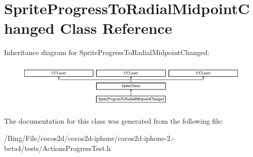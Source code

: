 \hypertarget{interface_sprite_progress_to_radial_midpoint_changed}{\section{Sprite\-Progress\-To\-Radial\-Midpoint\-Changed Class Reference}
\label{interface_sprite_progress_to_radial_midpoint_changed}
}
Inheritance diagram for Sprite\-Progress\-To\-Radial\-Midpoint\-Changed\-:\begin{figure}[H]
\begin{center}
\leavevmode
\includegraphics[height=2.222222cm]{interface_sprite_progress_to_radial_midpoint_changed}
\end{center}
\end{figure}


The documentation for this class was generated from the following file\-:\begin{DoxyCompactItemize}
\item 
/\-Bing/\-File/cocos2d/cocos2d-\/iphone/cocos2d-\/iphone-\/2.-\/beta4/tests/Actions\-Progress\-Test.\-h\end{DoxyCompactItemize}
